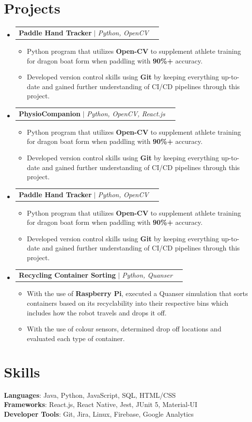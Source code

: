 \documentclass[letterpaper,11pt]{article}
\makeatletter
\newcommand{\resumeItem}[1]{
  \item\small{
    {#1 \vspace{-2pt}}
  }
}
\newcommand{\resumeProjectHeading}[2]{
    \item
    \begin{tabular*}{0.97\textwidth}{l@{\extracolsep{\fill}}r}
      \small#1 & #2 \\
    \end{tabular*}\vspace{-7pt}
}
\newcommand{\resumeSubHeadingListStart}{\begin{itemize}[leftmargin=0.15in, label={}]}
\newcommand{\resumeSubHeadingListEnd}{\end{itemize}}
\newcommand{\resumeItemListStart}{\begin{itemize}}
\newcommand{\resumeItemListEnd}{\end{itemize}\vspace{-5pt}}
\makeatother
\begin{document}
\section{Projects}
    \resumeSubHeadingListStart
      \resumeProjectHeading
        {\textbf{Paddle Hand Tracker} $|$ \emph{Python, OpenCV}}{}
        \resumeItemListStart
          \resumeItem{Python program that utilizes \textbf{Open-CV} to supplement athlete training for dragon boat form when paddling with \textbf{90\%+} accuracy.}
          \resumeItem{Developed version control skills using \textbf{Git} by keeping everything up-to-date and gained further understanding of CI/CD pipelines through this project.}
        \resumeItemListEnd

      \resumeProjectHeading
        {\textbf{PhysioCompanion} $|$ \emph{Python, OpenCV, React.js}}{}
        \resumeItemListStart
          \resumeItem{Python program that utilizes \textbf{Open-CV} to supplement athlete training for dragon boat form when paddling with \textbf{90\%+} accuracy.}
          \resumeItem{Developed version control skills using \textbf{Git} by keeping everything up-to-date and gained further understanding of CI/CD pipelines through this project.}
        \resumeItemListEnd

      \resumeProjectHeading
        {\textbf{Paddle Hand Tracker} $|$ \emph{Python, OpenCV}}{}
        \resumeItemListStart
          \resumeItem{Python program that utilizes \textbf{Open-CV} to supplement athlete training for dragon boat form when paddling with \textbf{90\%+} accuracy.}
          \resumeItem{Developed version control skills using \textbf{Git} by keeping everything up-to-date and gained further understanding of CI/CD pipelines through this project.}
        \resumeItemListEnd
      \resumeProjectHeading
        {\textbf{Recycling Container Sorting} $|$ \emph{Python, Quanser}}{}
        \resumeItemListStart
          \resumeItem{With the use of \textbf{Raspberry Pi}, executed a Quanser simulation that sorts containers based on its recyclability into their respective bins which includes how the robot travels and drops it off.}
          \resumeItem{With the use of colour sensors, determined drop off locations and evaluated each type of container.}
        \resumeItemListEnd
    \resumeSubHeadingListEnd

\section{Skills}
 \begin{itemize}[leftmargin=0.15in, label={}]
    \small{\item{
     \textbf{Languages}{: Java, Python, JavaScript, SQL, HTML/CSS} \\
     \textbf{Frameworks}{: React.js, React Native, Jest, JUnit 5, Material-UI} \\
     \textbf{Developer Tools}{: Git, Jira, Linux, Firebase, Google Analytics} \\
    }}
 \end{itemize}
\end{document}
